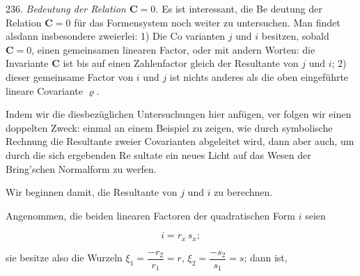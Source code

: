236. \textit{Bedeutung der Relation $\mathbf{C} = 0$.} Es ist interessant, die Be\-
deutung der Relation $\mathbf{C} = 0$ für das Formensystem noch weiter zu
untersuchen. Man findet alsdann insbesondere zweierlei: 1) Die Co\-
varianten $j$ und $i$ besitzen, sobald $\mathbf{C} = 0$, einen gemeinsamen linearen
Factor, oder mit andern Worten: die Invariante $\mathbf{C}$ ist bis auf einen
Zahlenfactor gleich der Resultante von $j$ und $i$; 2) dieser gemeinsame
Factor von $i$ und $j$ ist nichts anderes als die oben eingeführte lineare
Covariante $\varrho$.

Indem wir die diesbezüglichen Untersuchungen hier anfügen, ver\-
folgen wir einen doppelten Zweck: einmal an einem Beispiel zu zeigen,
wie durch symbolische Rechnung die Resultante zweier Covarianten
abgeleitet wird, dann aber auch, um durch die sich ergebenden Re\-
sultate ein neues Licht auf das Wesen der Bring'schen Normalform
zu werfen.

Wir beginnen damit, die Resultante von $j$ und $i$ zu berechnen.

Angenommen, die beiden linearen Factoren der quadratischen
Form $i$ seien

\[
i = r_x\,s_x;
\]

sie besitze also die Wurzeln $\xi_1 = \dfrac{-r_2}{r_1} = r$, $\xi_2 = \dfrac{-s_2}{s_1} = s$; dann ist,


